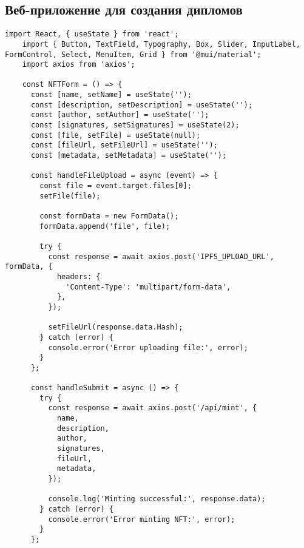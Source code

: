 \subsection{Веб-приложение для создания дипломов}
\label{appendix:sd_adm_webapp}

\begin{lstlisting}[label=lst:admin_webapp, language=React, caption=Интерфейс администратора для создания коллекции дипломов]
    import React, { useState } from 'react';
    import { Button, TextField, Typography, Box, Slider, InputLabel, FormControl, Select, MenuItem, Grid } from '@mui/material';
    import axios from 'axios';
    
    const NFTForm = () => {
      const [name, setName] = useState('');
      const [description, setDescription] = useState('');
      const [author, setAuthor] = useState('');
      const [signatures, setSignatures] = useState(2);
      const [file, setFile] = useState(null);
      const [fileUrl, setFileUrl] = useState('');
      const [metadata, setMetadata] = useState('');
    
      const handleFileUpload = async (event) => {
        const file = event.target.files[0];
        setFile(file);
    
        const formData = new FormData();
        formData.append('file', file);
    
        try {
          const response = await axios.post('IPFS_UPLOAD_URL', formData, {
            headers: {
              'Content-Type': 'multipart/form-data',
            },
          });
    
          setFileUrl(response.data.Hash);
        } catch (error) {
          console.error('Error uploading file:', error);
        }
      };
    
      const handleSubmit = async () => {
        try {
          const response = await axios.post('/api/mint', {
            name,
            description,
            author,
            signatures,
            fileUrl,
            metadata,
          });
    
          console.log('Minting successful:', response.data);
        } catch (error) {
          console.error('Error minting NFT:', error);
        }
      };
    

\end{lstlisting}
